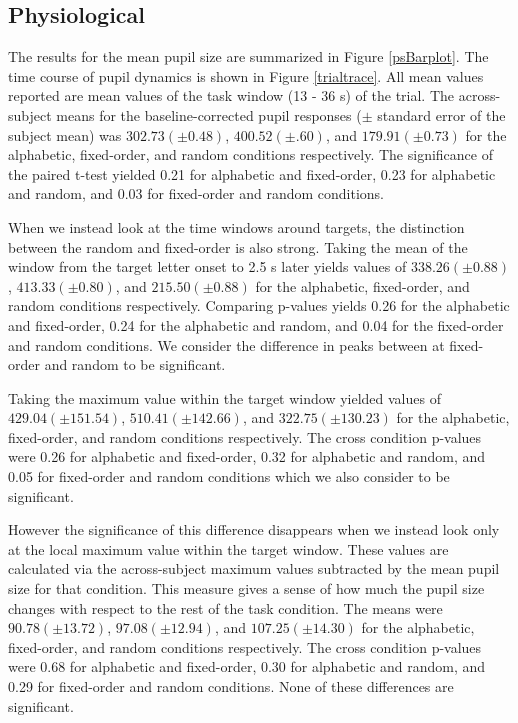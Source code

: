 \documentclass[10pt]{article}
\begin{document}
\subsection{Physiological}

The results for the mean pupil size are summarized in Figure
\ref{psBarplot}. The time course of pupil dynamics is shown in
Figure \ref{trialtrace}.  All mean values reported are mean
values of the
task window (13 - 36 s) of the trial.  The across-subject means for the
baseline-corrected pupil responses ($\pm$ standard error of
the subject mean) was $ 302.73 (\pm 0.48)$, $400.52 (\pm
.60)$, and $179.91 (\pm 0.73)$ for the alphabetic,
fixed-order, and random conditions respectively.  The
significance of the paired t-test yielded 0.21 for alphabetic
and fixed-order, 0.23 for alphabetic and random, and 0.03 for
fixed-order and random conditions.

When we instead look at the time windows around targets, the
distinction between the random and fixed-order is also strong.
Taking the mean of the window from the target letter onset to
2.5 s later yields values of $338.26 (\pm 0.88)$, $413.33 (\pm
0.80)$, and $215.50 (\pm 0.88)$ for the alphabetic,
fixed-order, and random conditions respectively.  Comparing
p-values yields 0.26 for the alphabetic and fixed-order, 0.24
for the alphabetic and random, and 0.04 for the fixed-order
and random conditions.  We consider the difference in peaks
between at fixed-order and random to be significant.

Taking the maximum value within the target window 
yielded  values of $429.04 (\pm 151.54)$, $510.41 (\pm
142.66)$, and $322.75 (\pm 130.23)$ for the alphabetic,
fixed-order, and random conditions respectively.  The cross
condition p-values were 0.26 for alphabetic and fixed-order,
0.32 for alphabetic and random, and 0.05 for fixed-order and
random conditions which we also consider to be significant.

However the significance of this difference disappears when we
instead look only at the local maximum value within the target window.
These values are calculated via the across-subject maximum values subtracted
by the mean pupil size for that condition.  This measure
gives a sense of how much the pupil size changes with respect
to the rest of the task condition. The means were $90.78 (\pm
13.72)$, $97.08 (\pm 12.94)$, and $107.25 (\pm 14.30)$ for the
alphabetic, fixed-order, and random conditions respectively.
The cross condition p-values were 0.68 for alphabetic and
fixed-order, 0.30 for alphabetic and random, and 0.29 for
fixed-order and random conditions.  None of these differences
are significant.
\end{document}
